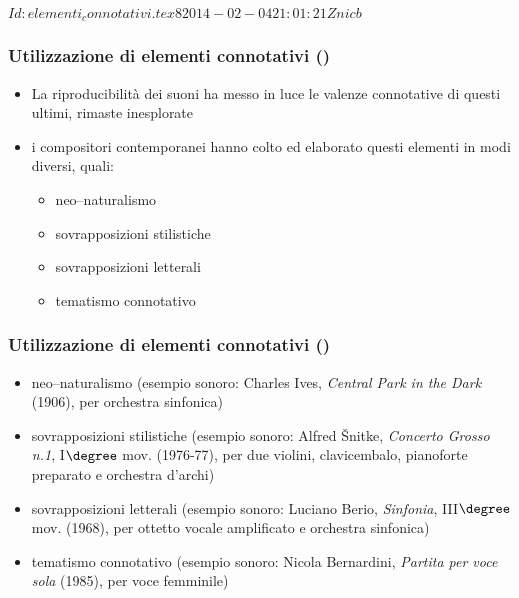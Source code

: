 %
%
\svnInfo $Id: elementi_connotativi.tex 8 2014-02-04 21:01:21Z nicb $

\setcounter{ms}{0}
\begin{frame}
    \frametitle{Utilizzazione di elementi connotativi ()}

    \begin{itemize}

        \item La riproducibilit\`a dei suoni ha messo in luce
            le valenze connotative di questi ultimi, rimaste inesplorate

        \item i compositori contemporanei hanno colto ed elaborato questi elementi
            in modi diversi, quali:

            \begin{itemize}

                \item neo--naturalismo

                \item sovrapposizioni stilistiche

                \item sovrapposizioni letterali

                \item tematismo connotativo
            \end{itemize}

    \end{itemize}

\end{frame}

\begin{frame}
    \frametitle{Utilizzazione di elementi connotativi ()}

    \begin{itemize}

        \item neo--naturalismo
            (esempio sonoro: Charles Ives, \emph{Central Park in the Dark} (1906), per orchestra sinfonica)

        \item sovrapposizioni stilistiche
           (esempio sonoro: Alfred \v{S}nitke,
        \emph{Concerto Grosso n.1}, I$\degree$ mov. (1976-77),
        per due violini, clavicembalo, pianoforte preparato
        e orchestra d'archi)
%
        \item sovrapposizioni letterali (esempio sonoro:
            Luciano Berio, \emph{Sinfonia}, III$\degree$ mov. (1968),
            per ottetto vocale amplificato e orchestra sinfonica)

        \item tematismo connotativo (esempio sonoro:
            Nicola Bernardini, \emph{Partita per voce sola} (1985),
                per voce femminile)
%
    \end{itemize}

\end{frame}
